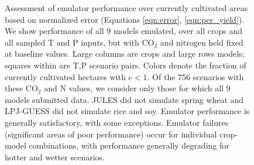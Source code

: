 \documentclass[preprint, 5p, times, twocolumn]{elsarticle}
\begin{document}
{\begin{figure}[!p]
    \caption{Assessment of emulator performance over currently cultivated areas based on normalized error (Equations \ref{eqn:error}, \ref{eqn:per_yield}). We show performance of all 9 models emulated, over all crops and all sampled T and P inputs, but with CO$_2$ and nitrogen held fixed at baseline values. Large columns are crops and large rows models; squares within are T,P scenario pairs. Colors denote the fraction of currently cultivated hectares with $ e < 1$.  Of the 756 scenarios with these CO$_2$ and N values, we consider only those for which all 9 models submitted data. JULES did not simulate spring wheat and LPJ-GUESS did not simulate rice and soy. Emulator performance is generally satisfactory, with some exceptions. Emulator failures (significant areas of poor performance) occur for individual crop-model combinations, with performance generally degrading for hotter and wetter scenarios.}
   \label{fig:error_360}
\end{figure}

}
\end{document}
